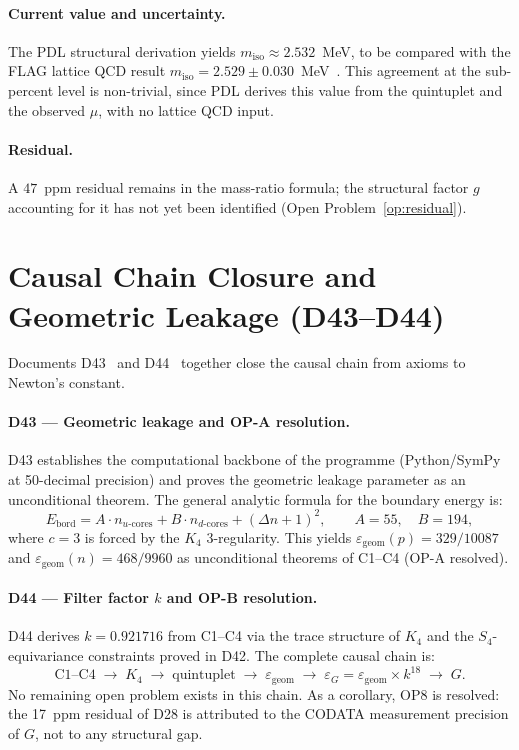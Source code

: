 \documentclass[11pt,a4paper]{article}
\theoremstyle{plain}
\theoremstyle{definition}
\theoremstyle{remark}
\begin{document}
\paragraph{Current value and uncertainty.} The PDL structural derivation yields $m_{\mathrm{iso}}\approx 2.532$~MeV, to be compared with the FLAG lattice QCD result $m_{\mathrm{iso}}=2.529\pm0.030$~MeV~\cite{D30}. This agreement at the sub-percent level is non-trivial, since PDL derives this value from the quintuplet and the observed $\mu$, with no lattice QCD input.

\paragraph{Residual.} A $47$~ppm residual remains in the mass-ratio formula; the structural factor $g$ accounting for it has not yet been identified (Open Problem~\ref{op:residual}).

\section{Causal Chain Closure and Geometric Leakage (D43--D44)}
\label{sec:numerical}

Documents D43~\cite{D43} and D44~\cite{D44} together close the causal chain from axioms to Newton's constant.

\paragraph{D43 --- Geometric leakage and OP-A resolution.} D43 establishes the computational backbone of the programme (Python/SymPy at 50-decimal precision) and proves the geometric leakage parameter as an unconditional theorem. The general analytic formula for the boundary energy is:
\begin{equation}
E_{\mathrm{bord}} = A \cdot n_{u\text{-cores}} + B \cdot n_{d\text{-cores}} + (\Delta n+1)^2, \qquad A = 55,\quad B = 194,
\end{equation}
where $c=3$ is forced by the $K_4$ 3-regularity. This yields $\varepsilon_{\mathrm{geom}}(p) = 329/10087$ and $\varepsilon_{\mathrm{geom}}(n) = 468/9960$ as unconditional theorems of C1--C4 (OP-A resolved).

\paragraph{D44 --- Filter factor $k$ and OP-B resolution.} D44 derives $k = 0.921716$ from C1--C4 via the trace structure of $K_4$ and the $S_4$-equivariance constraints proved in D42. The complete causal chain is:
\begin{equation*}
\text{C1--C4} \;\to\; K_4 \;\to\; \text{quintuplet} \;\to\; \varepsilon_{\mathrm{geom}} \;\to\; \varepsilon_G = \varepsilon_{\mathrm{geom}} \times k^{18} \;\to\; G.
\end{equation*}
No remaining open problem exists in this chain. As a corollary, OP8 is resolved: the 17~ppm residual of D28 is attributed to the CODATA measurement precision of $G$, not to any structural gap.
\end{document}
